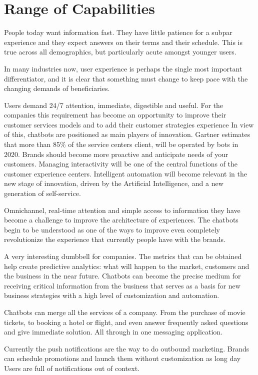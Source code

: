 \documentclass[	DIV=calc,%
							paper=letter,%
							fontsize=12pt%
                            ]{scrartcl}	 					%
\begin{document}
\section{\label{sec:level1}Range of Capabilities}
People today want information fast. They have little patience for a subpar experience and they expect answers on their terms and their schedule. This is true across all demographics, but particularly acute amongst younger users.

In many industries now, user experience is perhaps the single most important differentiator, and it is clear that something must change to keep pace with the changing demands of beneficiaries.

Users demand 24/7 attention, immediate, digestible and useful. For the companies this requirement has become an opportunity to improve their customer services models and to add their customer strategies
experience In view of this, chatbots are positioned as main players of innovation. Gartner estimates that more than 85\% of the service centers client, will be operated by bots in 2020.
Brands should become more proactive and anticipate needs of your customers. Managing interactivity will be one of the central functions of the customer experience centers. Intelligent automation will become relevant in the new stage of innovation, driven by the Artificial Intelligence, and a new generation of self-service. 

Omnichannel, real-time attention and simple access to information they have become a challenge to improve the architecture of experiences. The chatbots begin to be understood as one of the ways to improve even completely revolutionize the experience that currently people have with the brands.

A very interesting dumbbell for companies. The metrics that can be obtained help create predictive analytics: what will happen to the market, customers and the business in the near future. Chatbots can become the precise medium for receiving critical information from the business that serves as a basis for new business strategies with a high level of customization and automation.

Chatbots can merge all the services of a company. From the purchase of movie tickets, to booking a hotel or flight, and even answer frequently asked questions and give immediate solution. All through in one messaging application.

Currently the push notifications are the way to do outbound marketing. Brands can schedule promotions and launch them without customization as long day Users are full of notifications out of context.
\end{document}

